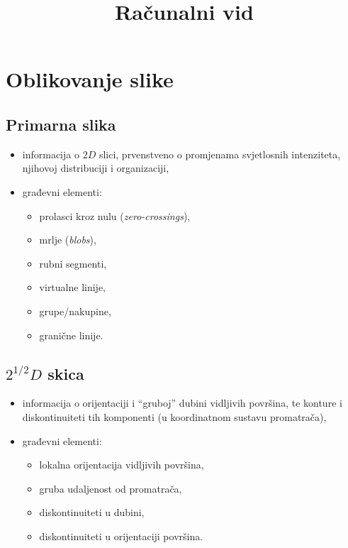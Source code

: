 \documentclass[11pt,english]{article}
\begin{document}
\title{Računalni vid}
\date{}
\maketitle

\section{Oblikovanje slike}

\subsection{Primarna slika}
\begin{itemize}
  \item informacija o $2D$ slici, prvenstveno o promjenama svjetlosnih intenziteta, njihovoj distribuciji i organizaciji,
  \item građevni elementi:
  \begin{itemize}
    \item prolasci kroz nulu (\emph{zero-crossings}),
    \item mrlje (\emph{blobs}),
    \item rubni segmenti,
    \item virtualne linije,
    \item grupe/nakupine,
    \item granične linije.
  \end{itemize}
\end{itemize}

\subsection{$2^{1/2}D$ skica}
\begin{itemize}
  \item informacija o orijentaciji i ``gruboj'' dubini vidljivih površina, te konture i diskontinuiteti tih komponenti (u koordinatnom sustavu promatrača),
  \item građevni elementi:
  \begin{itemize}
    \item lokalna orijentacija vidljivih površina,
    \item gruba udaljenost od promatrača,
    \item diskontinuiteti u dubini,
    \item diskontinuiteti u orijentaciji površina.
  \end{itemize}
\end{itemize}
\end{document}
